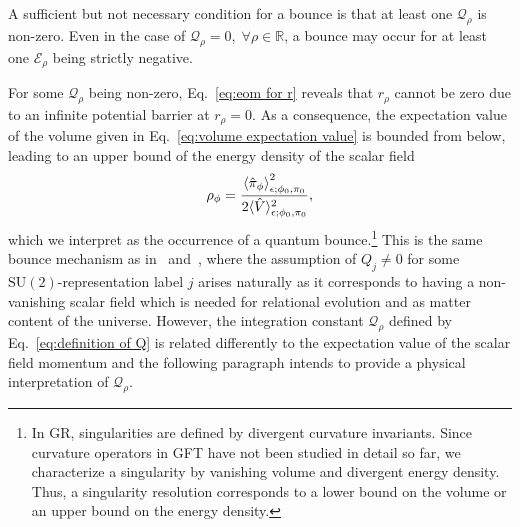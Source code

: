 \documentclass[11pt,a4paper]{article}
\newcommand{\R}{\mathbb R}
\newcommand{\SU}{\text{SU$(2)$}}
\begin{document}
A sufficient but not necessary condition for a bounce is that at least one $\mathcal{Q}_{\rho}$ is non-zero. Even in the case of $\mathcal{Q}_{\rho} = 0,\;\forall\rho\in\R$, a bounce may occur for at least one $\mathcal{E}_{\rho}$ being strictly negative.

For some $\mathcal{Q}_{\rho}$ being non-zero, Eq.~\eqref{eq:eom for r} reveals that $r_{\rho}$ cannot be zero due to an infinite potential barrier at $r_{\rho}=0$. As a consequence, the expectation value of the volume given in Eq.~\eqref{eq:volume expectation value} is bounded from below, leading to an upper bound of the energy density of the scalar field~\cite{Marchetti:2020umh}
%
\begin{equation}\label{eq:rho_phi}
\rho_{\phi}
=
\frac{\expval{\hat{\pi}_{\phi}}_{\epsilon;\phi_0,\pi_0}^2}{2 \langle\hat{V}\rangle_{\epsilon;\phi_0,\pi_0}^2},
\end{equation}
%
which we interpret as the occurrence of a quantum bounce.\footnote{In GR, singularities are defined by divergent curvature invariants. Since curvature operators in GFT have not been studied in detail so far, we characterize a singularity by vanishing volume and divergent energy density. Thus, a singularity resolution corresponds to a lower bound on the volume or an upper bound on the energy density.}  This is the same bounce mechanism as in~\cite{Oriti:2016qtz} and~\cite{Marchetti:2020umh}, where the assumption of $Q_j \neq 0$ for some $\SU$-representation label $j$ arises naturally as it corresponds to having a non-vanishing scalar field which is needed for relational evolution and as matter content of the universe.  However, the integration constant $\mathcal{Q}_{\rho}$ defined by Eq.~\eqref{eq:definition of Q} is related differently to the expectation value of the scalar field momentum and the following paragraph intends to provide a physical interpretation of $\mathcal{Q}_{\rho}$.
\end{document}
